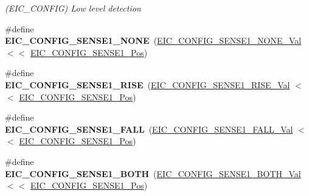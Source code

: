 \begin{DoxyCompactItemize}
\begin{DoxyCompactList}\small\item\em (E\+I\+C\+\_\+\+C\+O\+N\+F\+I\+G) Low level detection \end{DoxyCompactList}\item 
\hypertarget{group___s_a_m_l21___e_i_c_ga8ee9de103d7fa21e56b6ee8fb6a75df5}{}\#define {\bfseries E\+I\+C\+\_\+\+C\+O\+N\+F\+I\+G\+\_\+\+S\+E\+N\+S\+E1\+\_\+\+N\+O\+N\+E}~(\hyperlink{group___s_a_m_l21___e_i_c_ga2dd12fe5d69cac11eb3b807a1ba2972a}{E\+I\+C\+\_\+\+C\+O\+N\+F\+I\+G\+\_\+\+S\+E\+N\+S\+E1\+\_\+\+N\+O\+N\+E\+\_\+\+Val}    $<$$<$ \hyperlink{group___s_a_m_l21___e_i_c_gab34794f88d0b20fa2792afe7fecd7fc1}{E\+I\+C\+\_\+\+C\+O\+N\+F\+I\+G\+\_\+\+S\+E\+N\+S\+E1\+\_\+\+Pos})\label{group___s_a_m_l21___e_i_c_ga8ee9de103d7fa21e56b6ee8fb6a75df5}

\item 
\hypertarget{group___s_a_m_l21___e_i_c_ga21bd95765bfe75083196d06747ed35ed}{}\#define {\bfseries E\+I\+C\+\_\+\+C\+O\+N\+F\+I\+G\+\_\+\+S\+E\+N\+S\+E1\+\_\+\+R\+I\+S\+E}~(\hyperlink{group___s_a_m_l21___e_i_c_ga390eb7bfde2edc0c8f7c2aecc55f2f11}{E\+I\+C\+\_\+\+C\+O\+N\+F\+I\+G\+\_\+\+S\+E\+N\+S\+E1\+\_\+\+R\+I\+S\+E\+\_\+\+Val}    $<$$<$ \hyperlink{group___s_a_m_l21___e_i_c_gab34794f88d0b20fa2792afe7fecd7fc1}{E\+I\+C\+\_\+\+C\+O\+N\+F\+I\+G\+\_\+\+S\+E\+N\+S\+E1\+\_\+\+Pos})\label{group___s_a_m_l21___e_i_c_ga21bd95765bfe75083196d06747ed35ed}

\item 
\hypertarget{group___s_a_m_l21___e_i_c_gaf55ad673c13920e9d0c93a9427b9c4bb}{}\#define {\bfseries E\+I\+C\+\_\+\+C\+O\+N\+F\+I\+G\+\_\+\+S\+E\+N\+S\+E1\+\_\+\+F\+A\+L\+L}~(\hyperlink{group___s_a_m_l21___e_i_c_ga0ca6a376817490cb3ef82906ffe21923}{E\+I\+C\+\_\+\+C\+O\+N\+F\+I\+G\+\_\+\+S\+E\+N\+S\+E1\+\_\+\+F\+A\+L\+L\+\_\+\+Val}    $<$$<$ \hyperlink{group___s_a_m_l21___e_i_c_gab34794f88d0b20fa2792afe7fecd7fc1}{E\+I\+C\+\_\+\+C\+O\+N\+F\+I\+G\+\_\+\+S\+E\+N\+S\+E1\+\_\+\+Pos})\label{group___s_a_m_l21___e_i_c_gaf55ad673c13920e9d0c93a9427b9c4bb}

\item 
\hypertarget{group___s_a_m_l21___e_i_c_gac3a09f66728d85d1ee060b14e71f14db}{}\#define {\bfseries E\+I\+C\+\_\+\+C\+O\+N\+F\+I\+G\+\_\+\+S\+E\+N\+S\+E1\+\_\+\+B\+O\+T\+H}~(\hyperlink{group___s_a_m_l21___e_i_c_gabb0c4499b66df5612c61697749c38f6f}{E\+I\+C\+\_\+\+C\+O\+N\+F\+I\+G\+\_\+\+S\+E\+N\+S\+E1\+\_\+\+B\+O\+T\+H\+\_\+\+Val}    $<$$<$ \hyperlink{group___s_a_m_l21___e_i_c_gab34794f88d0b20fa2792afe7fecd7fc1}{E\+I\+C\+\_\+\+C\+O\+N\+F\+I\+G\+\_\+\+S\+E\+N\+S\+E1\+\_\+\+Pos})\label{group___s_a_m_l21___e_i_c_gac3a09f66728d85d1ee060b14e71f14db}


\end{DoxyCompactItemize}
